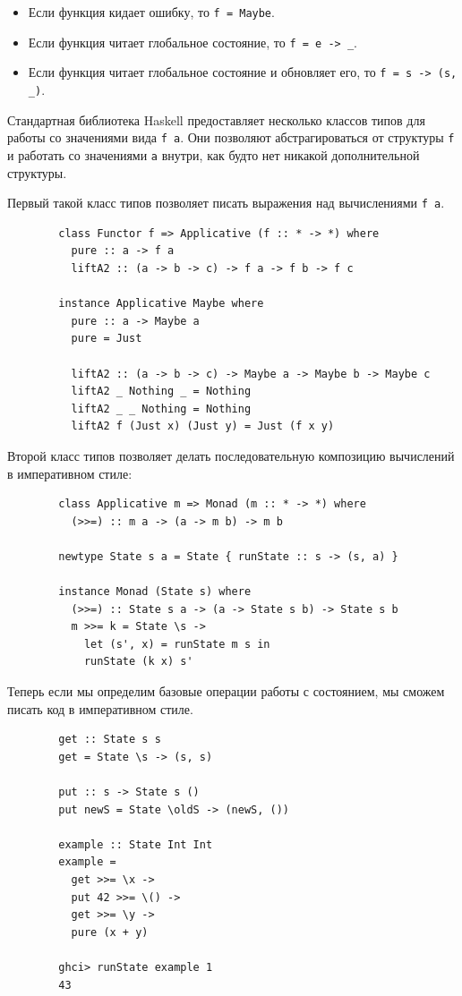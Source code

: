 \documentclass[12pt]{article}
\begin{document}
    \begin{itemize}
        \item Если функция кидает ошибку, то \texttt{f = Maybe}.
        \item Если функция читает глобальное состояние, то \texttt{f = e -> \_}.
        \item Если функция читает глобальное состояние и обновляет его, то \texttt{f = s -> (s, \_)}.
    \end{itemize}

    Стандартная библиотека Haskell предоставляет несколько классов типов для работы со значениями вида \texttt{f a}.
    Они позволяют абстрагироваться от структуры \texttt{f} и работать со значениями \texttt{a} внутри, как будто нет никакой дополнительной структуры.

    Первый такой класс типов позволяет писать выражения над вычислениями \texttt{f a}.
    \begin{verbatim}
        class Functor f => Applicative (f :: * -> *) where
          pure :: a -> f a
          liftA2 :: (a -> b -> c) -> f a -> f b -> f c

        instance Applicative Maybe where
          pure :: a -> Maybe a
          pure = Just

          liftA2 :: (a -> b -> c) -> Maybe a -> Maybe b -> Maybe c
          liftA2 _ Nothing _ = Nothing
          liftA2 _ _ Nothing = Nothing
          liftA2 f (Just x) (Just y) = Just (f x y)
    \end{verbatim}

    Второй класс типов позволяет делать последовательную композицию вычислений в императивном стиле:
    \begin{verbatim}
        class Applicative m => Monad (m :: * -> *) where
          (>>=) :: m a -> (a -> m b) -> m b

        newtype State s a = State { runState :: s -> (s, a) }

        instance Monad (State s) where
          (>>=) :: State s a -> (a -> State s b) -> State s b
          m >>= k = State \s ->
            let (s', x) = runState m s in
            runState (k x) s'
    \end{verbatim}

    Теперь если мы определим базовые операции работы с состоянием, мы сможем писать код в императивном стиле.
    \begin{verbatim}
        get :: State s s
        get = State \s -> (s, s)

        put :: s -> State s ()
        put newS = State \oldS -> (newS, ())

        example :: State Int Int
        example =
          get >>= \x ->
          put 42 >>= \() ->
          get >>= \y ->
          pure (x + y)

        ghci> runState example 1
        43
    \end{verbatim}
\end{document}

